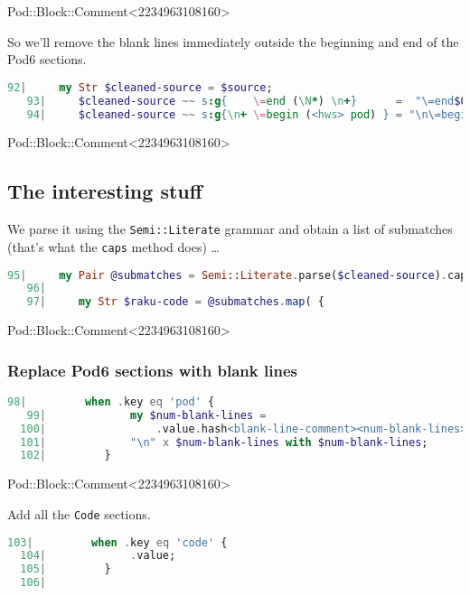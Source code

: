 \documentclass{scrartcl}
\begin{document}
Pod::Block::Comment<2234963108160>

So we'll remove the blank lines immediately outside the beginning and end
of the Pod6 sections.

\begin{lstlisting}[language=Raku]
   92|     my Str $cleaned-source = $source;
   93|     $cleaned-source ~~ s:g{    \=end (\N*) \n+}      =  "\=end$0\n";
   94|     $cleaned-source ~~ s:g{\n+ \=begin (<hws> pod) } = "\n\=begin$0";

\end{lstlisting}


Pod::Block::Comment<2234963108160>

\subsection{The interesting stuff}

We parse it using the \texttt{Semi::Literate} grammar and obtain a list of
submatches (that's what the \texttt{caps} method does) …

\begin{lstlisting}[language=Raku]
   95|     my Pair @submatches = Semi::Literate.parse($cleaned-source).caps;
   96| 
   97|     my Str $raku-code = @submatches.map( {

\end{lstlisting}


Pod::Block::Comment<2234963108160>

\subsubsection{Replace Pod6 sections with blank lines}

\begin{lstlisting}[language=Raku]
   98|         when .key eq 'pod' {
   99|             my $num-blank-lines =
  100|                 .value.hash<blank-line-comment><num-blank-lines>;
  101|             "\n" x $num-blank-lines with $num-blank-lines;
  102|         }

\end{lstlisting}


Pod::Block::Comment<2234963108160>

Add all the \texttt{Code} sections.

\begin{lstlisting}[language=Raku]
  103|         when .key eq 'code' {
  104|             .value;
  105|         } 
  106| 

\end{lstlisting}
\end{document}

